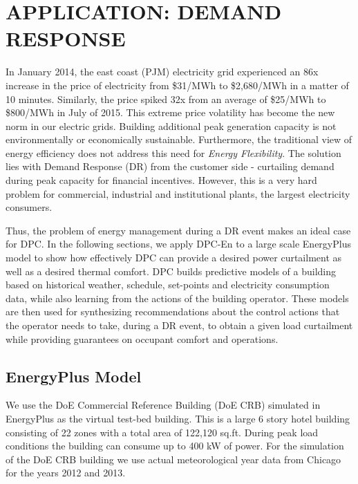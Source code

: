 \section{APPLICATION: DEMAND RESPONSE}
\label{S:casestudy}

In January 2014, the east coast (PJM) electricity grid experienced an 86x increase in the price of electricity from \$31/MWh to \$2,680/MWh in a matter of 10 minutes. Similarly, the price spiked 32x from an average of \$25/MWh to \$800/MWh in July of 2015. This extreme price volatility has become the new norm in our electric grids. Building additional peak generation capacity is not environmentally or economically sustainable. Furthermore, the traditional view of energy efficiency does not address this need for \emph{Energy Flexibility}. The solution lies with Demand Response (DR) from the customer side - curtailing demand during peak capacity for financial incentives. However, this is a very hard problem for commercial, industrial and institutional plants, the largest electricity consumers.

Thus, the problem of energy management during a DR event makes an ideal case for DPC. In the following sections, we apply DPC-En to a large scale EnergyPlus model to show how effectively DPC can provide a desired power curtailment as well as a desired thermal comfort. DPC builds predictive models of a building based on historical weather, schedule, set-points and electricity consumption data, while also learning from the actions of the building operator. These models are then used for synthesizing recommendations about the control actions that the operator needs to take, during a DR event, to obtain a given load curtailment while providing guarantees on occupant comfort and operations.

\subsection{EnergyPlus Model}
We use the DoE Commercial Reference Building (DoE CRB) simulated in EnergyPlus \cite{Deru2011} as the virtual test-bed building.
This is a large 6 story hotel building consisting of 22 zones with a total area of 122,120 sq.ft. 
During peak load conditions the building can consume up to 400 kW of power. 
For the simulation of the DoE CRB building we use actual meteorological year data from Chicago for the years 2012 and 2013. 

